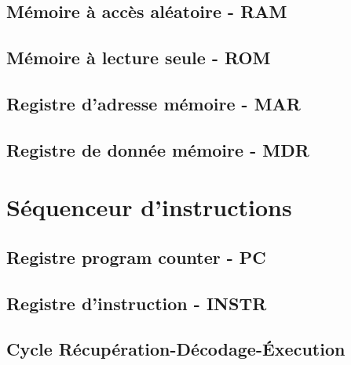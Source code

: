 \documentclass{scrreprt}
\begin{document}
	\section{Mémoire à accès aléatoire - RAM}
	
	\section{Mémoire à lecture seule - ROM}
	
	\section{Registre d'adresse mémoire - MAR}
	
	\section{Registre de donnée mémoire - MDR}
	
	\chapter{Séquenceur d'instructions}
	
	\section{Registre program counter - PC}
	
	\section{Registre d'instruction - INSTR}
	
	\section{Cycle Récupération-Décodage-Éxecution}
	
\end{document}
